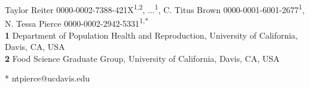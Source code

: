 \documentclass[10pt,letterpaper]{article}
\begin{document}
\vspace*{0.2in}

\begin{flushleft}
{\Large
\textbf{} %
}
\newline


Taylor Reiter 0000-0002-7388-421X\textsuperscript{1,2},
...\textsuperscript{1},
C. Titus Brown 0000-0001-6001-2677\textsuperscript{1},
N. Tessa Pierce 0000-0002-2942-5331\textsuperscript{1,*}
\\
\bigskip
\textbf{1} Department of Population Health and Reproduction, University of California, Davis, CA, USA
\\
\textbf{2} Food Science Graduate Group, University of California, Davis, CA, USA
\\
\bigskip

% 
%





* ntpierce@ucdavis.edu

\end{flushleft}
\end{document}
